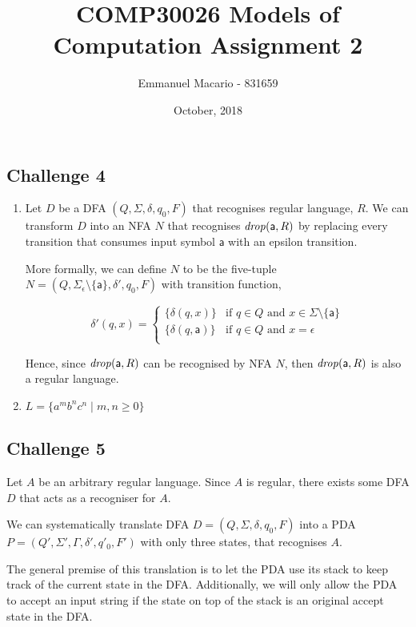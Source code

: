 \documentclass[12pt]{article}
\author{Emmanuel Macario - 831659}
\title{COMP30026 Models of Computation Assignment 2}
\date{October, 2018}
\newcommand{\id}[1]{\mbox{\textit{#1}}}
\newcommand{\ma}{\mathsf{a}}
\begin{document}
\maketitle

\subsection*{Challenge 4}

\begin{enumerate}
\item
Let $D$ be a DFA $(Q,\Sigma,\delta,q_0,F)$ that recognises regular language, $R$. We can transform 
$D$ into an NFA $N$ that recognises $\id{drop}(\ma,R)$ by replacing every transition that consumes input symbol
$\ma$ with an epsilon transition.

\bigskip
\noindent
More formally, we can define $N$ to be the five-tuple $N=(Q,\Sigma_\epsilon \setminus \{\ma\},\delta',q_0,F)$
with transition function,

\[
  \delta'(q, x) =
  \begin{cases}
  	\{\delta (q, x)\}     & \text{if $q \in Q$ and $x \in \Sigma \setminus \{\ma\}$} \\
      \{\delta (q, \ma)\} & \text{if $q \in Q$ and $x = \epsilon$} \\
  \end{cases}
\]

\bigskip
\noindent
Hence, since $\id{drop}(\ma,R)$ can be recognised by NFA $N$, then $\id{drop}(\ma,R)$ is also a regular language.

\item $L=\{a^m b^n c^n \mid m, n \geq 0\}$
\end{enumerate}


\subsection*{Challenge 5}

Let $A$ be an arbitrary regular language. Since $A$ is regular, there exists some DFA $D$ that acts as a recogniser for $A$.

\bigskip
\noindent
We can systematically translate DFA $D=(Q,\Sigma,\delta,q_0,F)$ into a PDA $P=(Q',\Sigma',\Gamma,\delta',q'_0,F')$ with only three states, that recognises $A$.

\bigskip
\noindent
The general premise of this translation is to let the PDA use its stack to keep track
of the current state in the DFA. Additionally, we will only allow the PDA to accept 
an input string if the state on top of the stack is an original accept state in the DFA.
\end{document}
